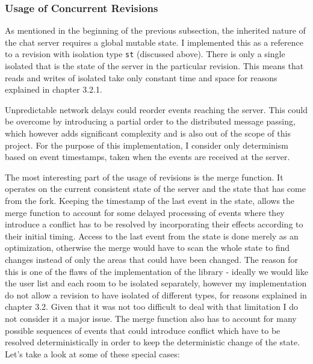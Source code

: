 \documentclass[12pt,twoside,notitlepage]{report}
\begin{document}
\subsubsection{Usage of Concurrent Revisions}
As mentioned in the beginning of the previous subsection, the inherited nature of the chat server requires a global mutable state. I implemented this as a reference to a revision with isolation type {\tt st} (discussed above). There is only a single isolated that is the state of the server in the particular revision. This means that reads and writes of isolated take only constant time and space for reasons explained in chapter 3.2.1.

Unpredictable network delays could reorder events reaching the server. This could be overcome by introducing a partial order to the distributed message passing, which however adds significant complexity and is also out of the scope of this project. For the purpose of this implementation, I consider only determinism based on event timestamps, taken when the events are received at the server.

The most interesting part of the usage of revisions is the merge function. It operates on the current consistent state of the server and the state that has come from the fork. Keeping the timestamp of the last event in the state, allows the merge function to account for some delayed processing of events where they introduce a conflict has to be resolved by incorporating their effects according to their initial timing. Access to the last event from the state is done merely as an optimization, otherwise the merge would have to scan the whole state to find changes instead of only the areas that could have been changed. The reason for this is one of the flaws of the implementation of the library - ideally we would like the user list and each room to be isolated separately, however my implementation do not allow a revision to have isolated of different types, for reasons explained in chapter 3.2. Given that it was not too difficult to deal with that limitation I do not consider it a major issue. The merge function also has to account for many possible sequences of events that could introduce conflict which have to be resolved deterministically in order to keep the deterministic change of the state. Let's take a look at some of these special cases:
\end{document}
